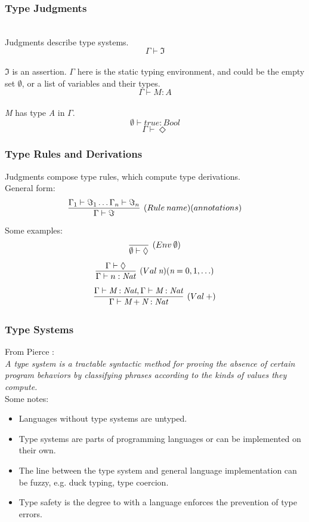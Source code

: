 \documentclass{beamer}
\newcommand{\G}{\Gamma}
\newcommand{\entails}{\vdash}
\begin{document}
\begin{frame}
  \frametitle{Type Judgments}
  \\
  \vspace{20pt}
  Judgments describe type systems.\\
  \[ \G \entails \Im \]\\
  $\Im$ is an assertion. $\Gamma$ here is the static typing environment, and
  could be the empty set $\emptyset$, or a list of variables and their types.\\
  \[ \G \entails \textit{M} : \textit{A} \]\\
  \textit{M} has type \textit{A} in $\Gamma$.\\
  \[ \emptyset \entails \textit{true} : \textit{Bool} \]
  \[ \G \entails \Diamond \]
\end{frame}

\begin{frame}
  \frametitle{Type Rules and Derivations}
  \vspace{20pt}
  Judgments compose type rules, which compute type derivations.\\
  \vspace{10pt}
  General form:
  \[ \infer[(Rule\:name)(annotations)]{\Gamma \entails \Im}{\Gamma_1 \entails \Im_1
      \ldots \Gamma_n \entails \Im_n} \]
  Some examples:
  \vspace{2pt}
  \[ \infer[(Env\:\emptyset)]{\emptyset \entails \Diamond}{} \]
  \vspace{2pt}
  \[ \infer[(Val\:\textit{n})(\textit{n} = 0,1,\ldots)]{\G \entails n :
      \textit{Nat}}{\G \entails \Diamond} \]
  \vspace{2pt}
  \[ \infer[(Val\:+)]{\G \entails \textit{M} + \textit{N} : \textit{Nat}}{\G
      \entails \textit{M} : \textit{Nat}, \G \entails \textit{M} : \textit{Nat}} \]
\end{frame}

\begin{frame}
  \frametitle{Type Systems}
  From Pierce \cite{TAPL}:\\
  \textit{A type system is a tractable syntactic method for proving the absence
    of certain program behaviors by classifying phrases according to the kinds
    of values they compute.}\\
  \vspace{20pt}
  Some notes:\\
  \begin{itemize}
    \item Languages without type systems are untyped.
    \item Type systems are parts of programming languages or can be implemented
      on their own.
    \item The line between the type system and general language implementation
      can be fuzzy, e.g. duck typing, type coercion.
    \item Type safety is the degree to with a language enforces the prevention
      of type errors.
  \end{itemize}
\end{frame}
\end{document}

